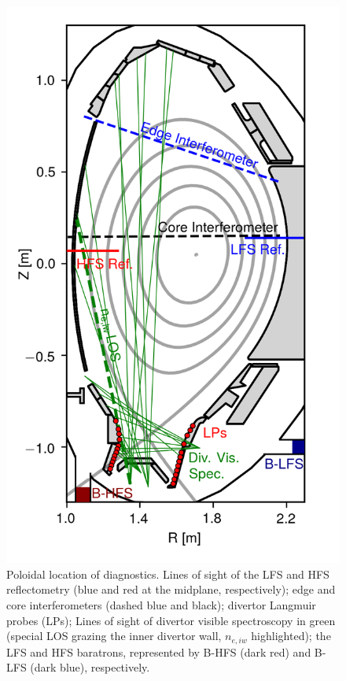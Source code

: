 \documentclass[12pt]{iopart}
\begin{document}
\begin{figure}[!hbt]
    \centering
    \includegraphics[]{Figure1.png}
    \caption[Main diagnostics used.]{Poloidal location of diagnostics. Lines of sight of the LFS and HFS reflectometry (blue and red at the midplane, respectively); edge and core interferometers (dashed blue and black); divertor Langmuir probes (LPs); Lines of sight of divertor visible spectroscopy in green (special LOS grazing the inner divertor wall, $n_{e,iw}$ highlighted); the LFS and HFS baratrons, represented by B-HFS (dark red) and B-LFS (dark blue), respectively.}
    \label{fig:diag_distribution}
\end{figure}
\end{document}
